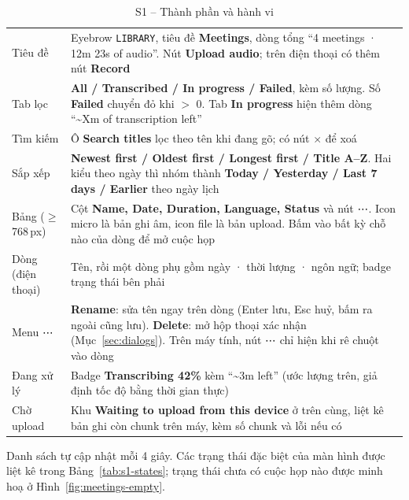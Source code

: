 \documentclass[12pt,a4paper]{report}
\newcommand{\ui}[1]{\textbf{#1}}
\begin{document}
\begin{table}[htbp]
  \centering
  \caption{S1 -- Thành phần và hành vi}
  \label{tab:s1}
  \small
  \begin{tabularx}{\linewidth}{@{}P{3cm}L@{}}
    \toprule
     &  \\
    \midrule
    Tiêu đề & Eyebrow \texttt{LIBRARY}, tiêu đề \ui{Meetings}, dòng tổng ``4 meetings · 12m 23s of audio''. Nút
      \ui{Upload audio}; trên điện thoại có thêm nút \ui{Record} \\
    Tab lọc & \ui{All / Transcribed / In progress / Failed}, kèm số lượng. Số \ui{Failed} chuyển đỏ khi $>$ 0. Tab
      \ui{In progress} hiện thêm dòng ``\textasciitilde Xm of transcription left'' \\
    Tìm kiếm & Ô \ui{Search titles} lọc theo tên khi đang gõ; có nút $\times$ để xoá \\
    Sắp xếp & \ui{Newest first / Oldest first / Longest first / Title A--Z}. Hai kiểu theo ngày thì nhóm thành
      \ui{Today / Yesterday / Last 7 days / Earlier} theo ngày lịch \\
    Bảng ($\geq$ 768\,px) & Cột \ui{Name, Date, Duration, Language, Status} và nút ⋯. Icon micro là bản ghi âm,
      icon file là bản upload. Bấm vào bất kỳ chỗ nào của dòng để mở cuộc họp \\
    Dòng (điện thoại) & Tên, rồi một dòng phụ gồm ngày · thời lượng · ngôn ngữ; badge trạng thái bên phải \\
    Menu ⋯ & \ui{Rename}: sửa tên ngay trên dòng (Enter lưu, Esc huỷ, bấm ra ngoài cũng lưu). \ui{Delete}: mở hộp
      thoại xác nhận (Mục~\ref{sec:dialogs}). Trên máy tính, nút ⋯ chỉ hiện khi rê chuột vào dòng \\
    Đang xử lý & Badge \ui{Transcribing 42\%} kèm ``\textasciitilde 3m left'' (ước lượng trên, giả định tốc độ
      bằng thời gian thực) \\
    Chờ upload & Khu \ui{Waiting to upload from this device} ở trên cùng, liệt kê bản ghi còn chunk trên máy, kèm
      số chunk và lỗi nếu có \\
    \bottomrule
  \end{tabularx}
\end{table}

Danh sách tự cập nhật mỗi 4 giây. Các trạng thái đặc biệt của màn hình được liệt kê trong Bảng~\ref{tab:s1-states};
trạng thái chưa có cuộc họp nào được minh hoạ ở Hình~\ref{fig:meetings-empty}.
\end{document}
